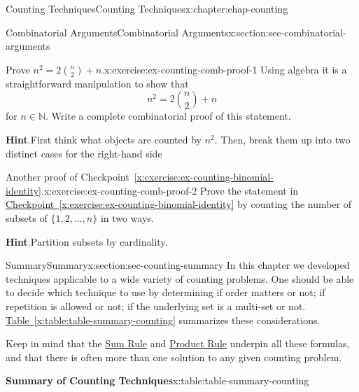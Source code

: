 \documentclass[oneside,10pt,]{book}
\newcommand{\blocktitlefont}{\relax}
\newcommand{\tabularfont}{\relax}
\newcommand{\xreffont}{\relax}
\numberwithin{equation}{section}
\begin{document}
\begin{chapterptx}{Counting Techniques}{}{Counting Techniques}{}{}{x:chapter:chap-counting}
\begin{sectionptx}{Combinatorial Arguments}{}{Combinatorial Arguments}{}{}{x:section:sec-combinatorial-arguments}
\begin{itemize}[label=\textbullet]
\end{itemize}
%
\begin{inlineexercise}{Prove \(n^2 = 2\binom{n}{2} + n\).}{x:exercise:ex-counting-comb-proof-1}%
Using algebra it is a straightforward manipulation to show that%
\begin{equation*}
n^2 = 2\binom{n}{2} + n
\end{equation*}
for \(n \in \mathbb{N}\). Write a complete combinatorial proof of this statement.%
\par\smallskip%
\noindent\textbf{\blocktitlefont Hint}.\hypertarget{g:hint:id230768}{}\quad{}First think what objects are counted by \(n^2\). Then, break them up into two distinct cases for the right-hand side%
\end{inlineexercise}
\begin{inlineexercise}{Another proof of Checkpoint~{\xreffont\ref*{x:exercise:ex-counting-binomial-identity}}.}{x:exercise:ex-counting-comb-proof-2}%
Prove the statement in \hyperref[x:exercise:ex-counting-binomial-identity]{Checkpoint~{\xreffont\ref{x:exercise:ex-counting-binomial-identity}}} by counting the number of subsets of \(\{1,2,\ldots,n\}\) in two ways.%
\par\smallskip%
\noindent\textbf{\blocktitlefont Hint}.\hypertarget{g:hint:id229845}{}\quad{}Partition subsets by cardinality.%
\end{inlineexercise}
\end{sectionptx}
%
%
\typeout{************************************************}
\typeout{************************************************}
%
\begin{sectionptx}{Summary}{}{Summary}{}{}{x:section:sec-counting-summary}
In this chapter we developed techniques applicable to a wide variety of counting problems. One should be able to decide which technique to use by determining if order matters or not; if repetition is allowed or not; if the underlying set is a multi-set or not. \hyperref[x:table:table-summary-counting]{Table~{\xreffont\ref{x:table:table-summary-counting}}} summarizes these considerations.%
\par
Keep in mind that the \hyperref[x:principle:prin-sum-rule]{Sum Rule} and \hyperref[x:principle:prin-prod-rule]{Product Rule} underpin all these formulas, and that there is often more than one solution to any given counting problem.%
\begin{tableptx}{\textbf{Summary of Counting Techniques}}{x:table:table-summary-counting}{}%
\centering
{\tabularfont%
\begin{tabular}{ccc}

\end{tabular}}
\end{tableptx}
\end{sectionptx}
\end{chapterptx}
\end{document}
